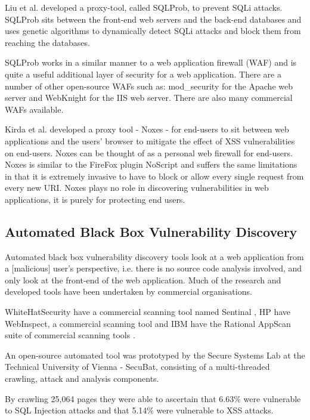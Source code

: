 \documentclass[12pt,a4paper]{article}
\begin{document}
Liu et al. developed  a proxy-tool, called SQLProb, to prevent SQLi attacks.  SQLProb sits between the front-end web servers and the back-end databases and uses genetic algorithms to dynamically detect SQLi attacks and block them from reaching the databases. \cite{Liu2009}

SQLProb works in a similar manner to a web application firewall (WAF) and is quite a useful additional layer of security for a web application.  There are a number of other open-source WAFs such as: mod\_security for the Apache web server \cite{ModSecurity:2010:Online} and WebKnight for the IIS web server. \cite{WebKnight:2010:Online}  There are also many commercial WAFs available.

Kirda et al. developed a proxy tool - Noxes - for end-users to sit between  web applications and the users’ browser to mitigate the effect of XSS vulnerabilities on end-users.  Noxes can be thought of as a personal web firewall for end-users. \cite{Kirda2006} Noxes is similar to the FireFox plugin NoScript \cite{NoScript:2010:Online} and suffers the same limitations in that it is extremely invasive to have to block or allow every single request from every new URI.  Noxes plays no role in discovering vulnerabilities in web applications, it is purely for protecting end users.

\subsection{Automated Black Box Vulnerability Discovery}
Automated black box vulnerability discovery tools look at a web application from a [malicious] user’s perspective, i.e. there is no source code analysis involved, and only look at the front-end of the web application.  Much of the research and developed tools have been undertaken by commercial organisations.

WhiteHatSecurity have a commercial scanning tool named Sentinal \cite{WhiteHatSecurity:2010:Online}, HP have WebInspect, a commercial scanning tool \cite{HPWebInspect:2010:Online} and IBM have the Rational AppScan suite of commercial scanning tools \cite{IBM:2010:Online}. 

An open-source automated tool was prototyped by the Secure Systems Lab at the Technical University of Vienna - SecuBat, consisting of a multi-threaded crawling, attack and analysis components.   

By crawling 25,064 pages they were able to ascertain that 6.63\% were vulnerable to SQL Injection attacks and that 5.14\% were vulnerable to XSS attacks. \cite{Kals2006}
\end{document}
